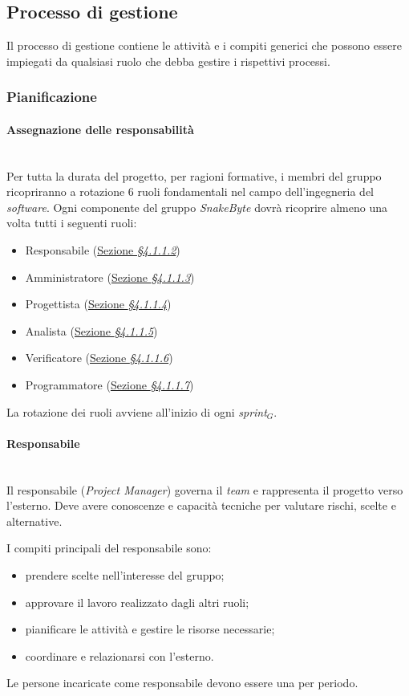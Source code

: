 \documentclass[10pt, letterpaper]{article}
\newcommand{\trisubsection}[1]{\paragraph{#1}\mbox{}\\}
\begin{document}
\subsection{Processo di gestione}
Il processo di gestione contiene le attività e i compiti generici che possono essere impiegati da qualsiasi
ruolo che debba gestire i rispettivi processi.

\subsubsection{Pianificazione}

\trisubsection{Assegnazione delle responsabilità}
Per tutta la durata del progetto, per ragioni formative, i membri del gruppo ricopriranno a rotazione 6 ruoli fondamentali nel campo dell'ingegneria del \textit{software}. Ogni componente del gruppo \textit{SnakeByte} dovrà ricoprire almeno una volta tutti i seguenti ruoli:
\begin{itemize}
    \item Responsabile (\hyperref[sec:Responsabile]{Sezione \textit{§4.1.1.2}})
    \item Amministratore (\hyperref[sec:Amministratore]{Sezione \textit{§4.1.1.3}})
    \item Progettista (\hyperref[sec:Progettista]{Sezione \textit{§4.1.1.4}})
    \item Analista (\hyperref[sec:Analista]{Sezione \textit{§4.1.1.5}})
    \item Verificatore (\hyperref[sec:Verificatore]{Sezione \textit{§4.1.1.6}})
    \item Programmatore (\hyperref[sec:Programmatore]{Sezione \textit{§4.1.1.7}})
\end{itemize}
La rotazione dei ruoli avviene all'inizio di ogni \textit{sprint$_{G}$}.

\label{sec:Responsabile}
\trisubsection{Responsabile}
Il responsabile (\textit{Project Manager}) governa il \textit{team} e rappresenta il progetto verso l'esterno. Deve avere conoscenze e capacità tecniche per valutare rischi, scelte e alternative.

I compiti principali del responsabile sono:
\begin{itemize}
    \item prendere scelte nell'interesse del gruppo;
    \item approvare il lavoro realizzato dagli altri ruoli;
    \item pianificare le attività e gestire le risorse necessarie;
    \item coordinare e relazionarsi con l'esterno.
\end{itemize}
Le persone incaricate come responsabile devono essere una per periodo.
\end{document}
